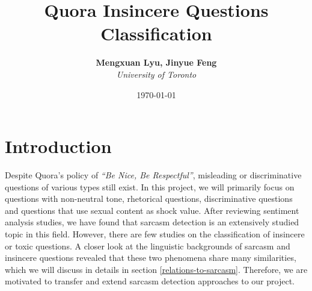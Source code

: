 \documentclass[12pt]{diazessay} %
\title{\textbf{Quora Insincere Questions Classification}} %
\author{\textbf{Mengxuan Lyu, Jinyue Feng} \\ \textit{University of Toronto}} %
\date{\today} %
\begin{document}
\maketitle %






\doublespacing %

\section{Introduction}

Despite Quora's policy of \textit{``Be Nice, Be Respectful''}, misleading or discriminative questions of various types still exist. In this project, we will primarily focus on questions with non-neutral tone, rhetorical questions, discriminative questions and questions that use sexual content as shock value. After reviewing sentiment analysis studies, we have found that sarcasm detection is an extensively studied topic in this field. However, there are few studies on the classification of insincere or toxic questions. A closer look at the linguistic backgrounds of sarcasm and insincere questions revealed that these two phenomena share many similarities, which we will discuss in details in section \ref{relations-to-sarcasm}. Therefore, we are motivated to transfer and extend sarcasm detection approaches to our project. 
\end{document}
